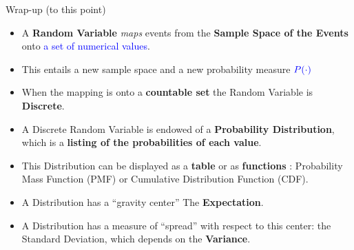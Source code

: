 \documentclass[smaller, handout]{beamer}\usepackage[]{graphicx}\usepackage[]{color}
\begin{document}
\begin{frame}{Wrap-up (to this point)}
  \begin{itemize}
  \item A \textbf{Random Variable} \emph{maps} events from the \textbf{Sample Space of the Events} onto \textcolor{blue}{a set of numerical values}.
  \medskip
  \item This entails a new sample space and a new probability measure $\color{blue}P(\cdot)$
  \medskip
  \item When the mapping is onto a \textbf{countable set} the Random Variable is \textbf{Discrete}.
  \medskip
  \item A Discrete Random Variable is endowed of a \textbf{Probability Distribution}, which is a \textbf{listing of the probabilities of each value}.
  \medskip
  \item This Distribution can be displayed as a \textbf{table} or as \textbf{functions} : Probability Mass Function (PMF) or Cumulative Distribution Function (CDF).
  \medskip
  \item A Distribution has a ``gravity center'' The \textbf{Expectation}.
  \item A Distribution has a measure of ``spread'' with respect to this center:
  the Standard Deviation, which depends on the \textbf{Variance}.
  \end{itemize}
\end{frame}
\end{document}
